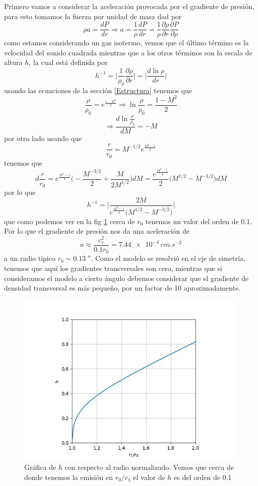 \documentclass{book}
\begin{document}
Primero vamos a considerar la aceleración provocada por el gradiente de presión, para esto tomamos la fuerza por unidad de masa dad por \[\rho a = \frac{dP}{dr}\Rightarrow a= \frac{1}{\rho}\frac{dP}{dr}=\frac{1}{\rho}\frac{\partial \rho}{\partial r}\frac{\partial P}{\partial\rho}\] como estamos considerando un gas isotermo, vemos que el último término es la velocidad del sonido cuadrada mientras que a los otros términos son la escala de altura $h$, la cual está definida por  \[h^{-1}=\Big|\frac{1}{\rho_0}\frac{\partial\rho}{\partial r}\Big|=\Big|\frac{d \ln \rho}{dr}\Big|\]
usando las ecuaciones de la sección \ref{Estructura} tenemos que \[\frac{\rho}{\rho_0}=e^{\frac{1-M^2}{2}}\Rightarrow\ln\frac{\rho}{\rho_0}=\frac{1-M^2}{2}\]\[\Rightarrow\frac{d\ln\frac{\rho}{\rho_0}}{dM}=-M\] por otro lado usando que \[\frac{r}{r_0}=M^{-1/2}e^{\frac{M^2-1}{2}}\] tenemos que \[d\frac{r}{r_0}=e^{\frac{M^2-1}{4}}\Big(-\frac{M^{-3/2}}{2}+\frac{M}{2M^{1/2}}\Big)dM = \frac{e^{\frac{M^2-1}{4}}}{2}\Big(M^{1/2}-M^{-3/2}\Big)dM\] por lo que \[h^{-1}=\Big|\frac{2M}{e^{\frac{M^2-1}{4}}\Big(M^{1/2}-M^{-3/2}\Big)}\Big|\] que como podemos ver en la fig \ref{fig:h} cerca de $r_0$ tenemos un valor del orden de 0.1. Por lo que el gradiente de presión nos da una aceleración de \[a \approx \frac{c_s^2}{0.1 r_0} = \SI{7.44e-4}{cm.s^{-2}}\] a un radio típico $r_0\sim \SI{0.13}{\arcsecond}$. Como el modelo se resolvió en el eje de simetría, tenemos que aquí los gradientes transversales son cero, mientras que si consideramos el modelo a cierto ángulo debemos considerar que el gradiente de densidad transversal es más pequeño, por un factor de 10 aproximadamente. 

\begin{figure}
    \centering
    \includegraphics{Appendices/h_3.jpg}
    \caption{Gráfica de $h$ con respecto al radio normalizado. Vemos que cerca de donde tenemos la emisión en $r_0/r_1$ el valor de $h$ es del orden de 0.1}
    \label{fig:h}
\end{figure}
\end{document}
